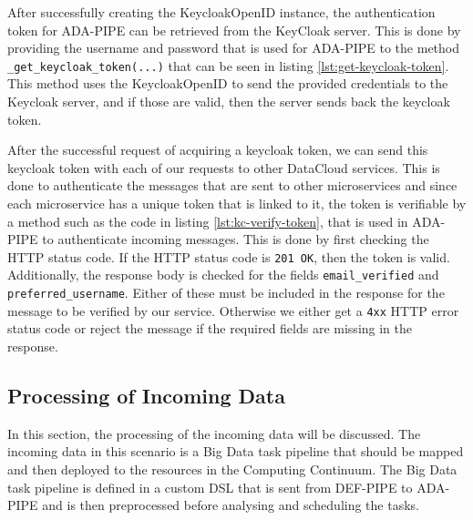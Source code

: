 \documentclass{article}
\begin{document}
            
            After successfully creating the KeycloakOpenID instance, the authentication token for ADA-PIPE can be retrieved from the KeyCloak server. This is done by providing the username and password that is used for ADA-PIPE to the method \texttt{\_get\_keycloak\_token(...)} that can be seen in listing \ref{lst:get-keycloak-token}. This method uses the KeycloakOpenID to send the provided credentials to the Keycloak server, and if those are valid, then the server sends back the keycloak token.
            
            
            After the successful request of acquiring a keycloak token, we can send this keycloak token with each of our requests to other DataCloud services. This is done to authenticate the messages that are sent to other microservices and since each microservice has a unique token that is linked to it, the token is verifiable by a method such as the code in listing \ref{lst:kc-verify-token}, that is used in ADA-PIPE to authenticate incoming messages. This is done by first checking the HTTP status code. If the HTTP status code is \texttt{201 OK}, then the token is valid. Additionally, the response body is checked for the fields \texttt{email\_verified} and \texttt{preferred\_username}. Either of these must be included in the response for the message to be verified by our service. Otherwise we either get a \texttt{4xx} HTTP error status code or reject the message if the required fields are missing in the response.

            

        \subsection{Processing of Incoming Data}
        \label{sec:processing-of-data-server}

            In this section, the processing of the incoming data will be discussed.
            The incoming data in this scenario is a Big Data task pipeline that should be mapped and then deployed to the resources in the Computing Continuum. The Big Data task pipeline is defined in a custom DSL \cite{mehranDSLDEFPIPEExample2023} that is sent from DEF-PIPE to ADA-PIPE and is then preprocessed before analysing and scheduling the tasks. 
\end{document}
